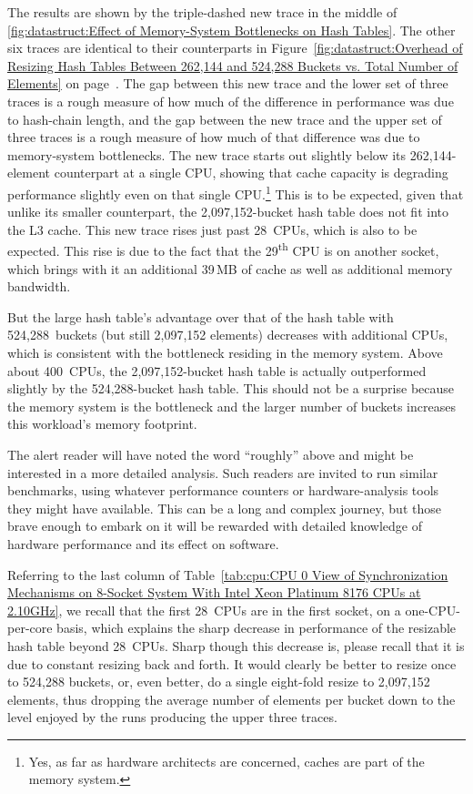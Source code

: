 {	The results are shown by the triple-dashed new trace in
	the middle of
	\cref{fig:datastruct:Effect of Memory-System Bottlenecks on Hash Tables}.
	The other six traces are identical to their counterparts in
	Figure~\ref{fig:datastruct:Overhead of Resizing Hash Tables Between 262,144 and 524,288 Buckets vs. Total Number of Elements}
	on page~\pageref{fig:datastruct:Overhead of Resizing Hash Tables Between 262,144 and 524,288 Buckets vs. Total Number of Elements}.
	The gap between this new trace and the lower set of three
	traces is a rough measure of how much of the difference in
	performance was due to hash-chain length, and the gap between
	the new trace and the upper set of three traces is a rough measure
	of how much of that difference was due to memory-system bottlenecks.
	The new trace starts out slightly below its 262,144-element
	counterpart at a single CPU, showing that cache capacity is
	degrading performance slightly even on that single CPU\@.\footnote{
		Yes, as far as hardware architects are concerned,
		caches are part of the memory system.}
	This is to be expected, given that unlike its smaller counterpart,
	the 2,097,152-bucket hash table does not fit into the L3 cache.
	This new trace rises just past 28~CPUs, which is also to be
	expected.
	This rise is due to the fact that the 29\textsuperscript{th}
	CPU is on another socket, which brings with it an additional
	39\,MB of cache as well as additional memory bandwidth.

	But the large hash table's advantage over that of the hash table
	with 524,288~buckets (but still 2,097,152 elements) decreases
	with additional CPUs, which is consistent with the bottleneck
	residing in the memory system.
	Above about 400~CPUs, the 2,097,152-bucket hash table is
	actually outperformed slightly by the 524,288-bucket hash
	table.
	This should not be a surprise because the memory system is
	the bottleneck and the larger number of buckets increases this
	workload's memory footprint.

	The alert reader will have noted the word ``roughly'' above
	and might be interested in a more detailed analysis.
	Such readers are invited to run similar benchmarks, using
	whatever performance counters or hardware-analysis tools
	they might have available.
	This can be a long and complex journey, but those brave enough
	to embark on it will be rewarded with detailed knowledge of
	hardware performance and its effect on software.
}\QuickQuizEnd

Referring to the last column of
Table~\ref{tab:cpu:CPU 0 View of Synchronization Mechanisms on 8-Socket System With Intel Xeon Platinum 8176 CPUs at 2.10GHz},
we recall that the first 28~CPUs are in the first socket, on a
one-CPU-per-core basis, which explains the sharp decrease in performance
of the resizable hash table beyond 28~CPUs.
Sharp though this decrease is, please recall that it is due to constant
resizing back and forth.
It would clearly be better to resize once to 524,288 buckets,
or, even better, do a single eight-fold resize to 2,097,152 elements,
thus dropping the average number of elements per bucket down to the
level enjoyed by the runs producing the upper three traces.

